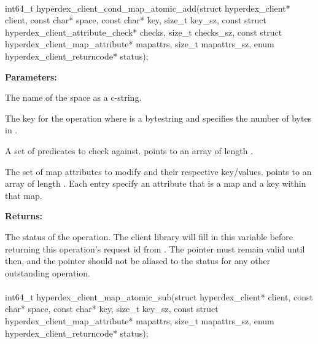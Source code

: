 \paragraph{}
\begin{ccode}
int64_t hyperdex_client_cond_map_atomic_add(struct hyperdex_client* client,
                const char* space,
                const char* key, size_t key_sz,
                const struct hyperdex_client_attribute_check* checks, size_t checks_sz,
                const struct hyperdex_client_map_attribute* mapattrs, size_t mapattrs_sz,
                enum hyperdex_client_returncode* status);
\end{ccode}
\funcdesc 

\noindent\textbf{Parameters:}
\begin{description}[labelindent=\widthof{{\code{mapattrs}, \code{mapattrs\_sz}}},leftmargin=*,noitemsep,nolistsep,align=right]
\item[\code{space}] The name of the space as a c-string.
\item[\code{key}, \code{key\_sz}] The key for the operation where  is a bytestring and  specifies the number of bytes in .
\item[\code{checks}, \code{checks\_sz}] A set of predicates to check against.   points to an array of length .
\item[\code{mapattrs}, \code{mapattrs\_sz}] The set of map attributes to modify and their respective key/values.   points to an array of length .  Each entry specify an attribute that is a map and a key within that map.
\end{description}

\noindent\textbf{Returns:}
\begin{description}[labelindent=\widthof{{\code{status}}},leftmargin=*,noitemsep,nolistsep,align=right]
\item[\code{status}] The status of the operation.  The client library will fill in this variable before returning this operation's request id from .  The pointer must remain valid until then, and the pointer should not be aliased to the status for any other outstanding operation.
\end{description}

\paragraph{}
\begin{ccode}
int64_t hyperdex_client_map_atomic_sub(struct hyperdex_client* client,
                const char* space,
                const char* key, size_t key_sz,
                const struct hyperdex_client_map_attribute* mapattrs, size_t mapattrs_sz,
                enum hyperdex_client_returncode* status);
\end{ccode}
\funcdesc 

